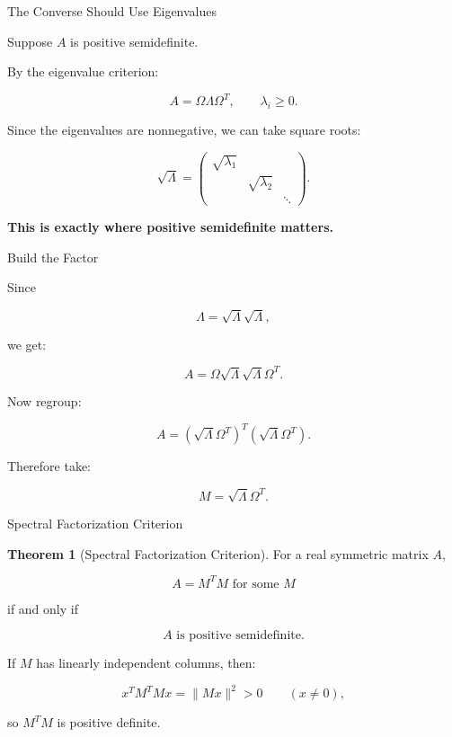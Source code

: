 \documentclass[10pt]{beamer}
\theoremstyle{definition}
\newtheorem{thm}{Theorem}[section]
\newcommand{\x}[1]{\alert{\textbf{#1}}}
\begin{document}
\begin{frame}{The Converse Should Use Eigenvalues}

Suppose $A$ is positive semidefinite.

\vfill

By the eigenvalue criterion:

$$
A=\Omega\Lambda\Omega^T,
\qquad
\lambda_i\ge0.
$$

\vfill

Since the eigenvalues are nonnegative, we can take square roots:

$$
\sqrt{\Lambda}=
\begin{pmatrix}
\sqrt{\lambda_1}&&\\
&\sqrt{\lambda_2}&\\
&&\ddots
\end{pmatrix}.
$$

\vfill

\begin{center}
\x{This is exactly where positive semidefinite matters.}
\end{center}

\end{frame}


\begin{frame}{Build the Factor}

Since

$$
\Lambda=\sqrt{\Lambda}\sqrt{\Lambda},
$$

we get:

$$
A=\Omega\sqrt{\Lambda}\sqrt{\Lambda}\Omega^T.
$$

\vfill

Now regroup:

$$
A=(\sqrt{\Lambda}\Omega^T)^T(\sqrt{\Lambda}\Omega^T).
$$

\vfill

Therefore take:

$$
\boxed{M=\sqrt{\Lambda}\Omega^T.}
$$

\end{frame}


\begin{frame}{Spectral Factorization Criterion}

\begin{thm}[Spectral Factorization Criterion]
For a real symmetric matrix $A$,

$$
\boxed{A=M^TM\text{ for some }M}
$$

if and only if

$$
\boxed{A\text{ is positive semidefinite}.}
$$
\end{thm}

\vfill

If $M$ has linearly independent columns, then:

$$
x^TM^TMx=\|Mx\|^2>0
\qquad(x\ne0),
$$

so $M^TM$ is positive definite.

\end{frame}
\end{document}
